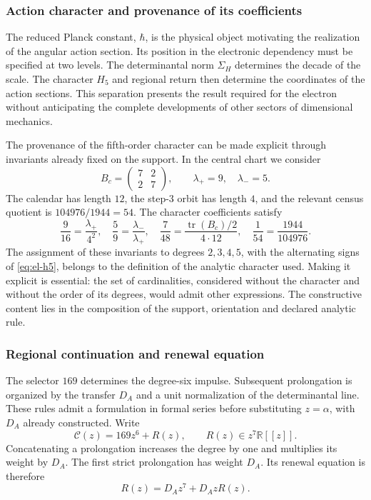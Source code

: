 \subsubsection{Action character and provenance of its coefficients}
\label{sec:revision-planck}

The reduced Planck constant, \(\hbar\), is the physical object
motivating the realization of the angular action section. Its position in
the electronic dependency must be specified at two levels. The determinantal
norm \(\Sigma_H\) determines the decade of the scale. The character
\(H_5\) and regional return then determine the coordinates of the
action sections. This separation presents the result
required for the electron without anticipating the complete developments of
other sectors of dimensional mechanics.

The provenance of the fifth-order character can be made explicit through
invariants already fixed on the support. In the central chart we consider
\[
 B_c=\begin{pmatrix}7&2\\2&7\end{pmatrix},
 \qquad \lambda_+=9,\quad\lambda_-=5.
\]
The calendar has length \(12\), the step-\(3\) orbit has
length \(4\), and the relevant census quotient is
\(104976/1944=54\). The character coefficients satisfy
\begin{equation}
 \frac9{16}=\frac{\lambda_+}{4^2},\quad
 \frac59=\frac{\lambda_-}{\lambda_+},\quad
 \frac7{48}=\frac{\operatorname{tr}(B_c)/2}{4\cdot12},\quad
 \frac1{54}=\frac{1944}{104976}.
 \label{eq:revision-h5-coeficientes}
\end{equation}
The assignment of these invariants to degrees \(2,3,4,5\), with the
alternating signs of \eqref{eq:el-h5}, belongs to the definition of the
analytic character used. Making it explicit is essential: the set of
cardinalities, considered without the character and without the order of its degrees,
would admit other expressions. The constructive content lies in the
composition of the support, orientation and declared analytic rule.

\subsubsection{Regional continuation and renewal equation}

The selector \(169\) determines the degree-six impulse. Subsequent
prolongation is organized by the transfer \(D_A\) and a unit
normalization of the determinantal line. These rules admit a formulation
in formal series before substituting \(z=\alpha\), with \(D_A\) already
constructed. Write
\[
 \mathscr C(z)=169z^6+R(z),\qquad R(z)\in z^7\mathbb R[[z]].
\]
Concatenating a prolongation increases the degree by one and
multiplies its weight by \(D_A\). The first strict prolongation has
weight \(D_A\). Its renewal equation is therefore
\begin{equation}
 R(z)=D_Az^7+D_AzR(z).
 \label{eq:revision-renovacion}
\end{equation}

